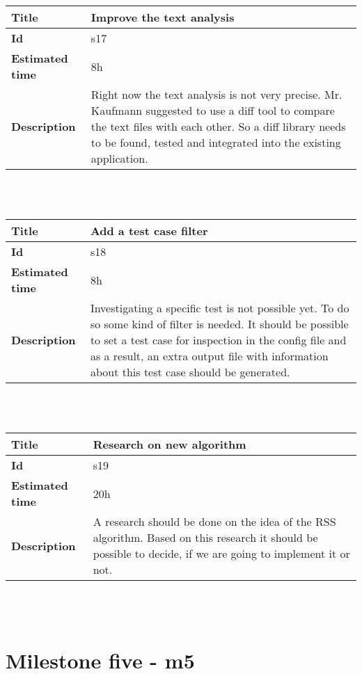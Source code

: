         \begin{tabular}{ | p{4cm} | p{10cm} |}
    \hline
    \textbf{Title} & Improve the text analysis\\ \hline
    \textbf{Id} & s17\\ \hline
    \textbf{Estimated time} & 8h \\ \hline
    \textbf{Description} &  Right now the text analysis is not very precise. Mr. Kaufmann suggested to use a diff tool to compare the text files with each other. So a diff library needs to be found, tested and integrated into the existing application.\\ 
    \hline
    \end{tabular} \\\\

        \begin{tabular}{ | p{4cm} | p{10cm} |}
    \hline
    \textbf{Title} & Add a test case filter\\ \hline
    \textbf{Id} & s18\\ \hline
    \textbf{Estimated time} & 8h \\ \hline
    \textbf{Description} &  Investigating a specific test is not possible yet. To do so some kind of filter is needed. It should be possible to set a test case for inspection in the config file and as a result, an extra output file with information about this test case should be generated.\\ 
    \hline
    \end{tabular} \\\\

        \begin{tabular}{ | p{4cm} | p{10cm} |}
    \hline
    \textbf{Title} & Research on new algorithm\\ \hline
    \textbf{Id} & s19\\ \hline
    \textbf{Estimated time} & 20h \\ \hline
    \textbf{Description} &  A research should be done on the idea of the RSS algorithm. Based on this research it should be possible to decide, if we are going to implement it or not.\\ 
    \hline
    \end{tabular} \\\\


\section{Milestone five - m5}

